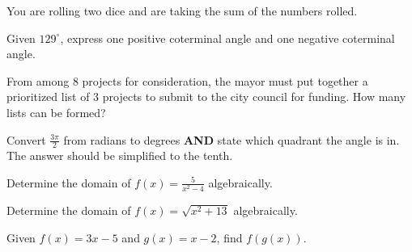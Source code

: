 \documentclass[addpoints]{exam}
\begin{document}
\begin{questions}
    \question[1] You are rolling two dice and are taking the sum of the numbers rolled. 
    \newpage
    \question[1] Given $129^\circ$, express one positive coterminal angle and one negative coterminal angle.
    
    \question[1] From among 8 projects for consideration, the mayor must put together a prioritized list of 3 projects to submit to the city council for funding. How many lists can be formed? 
    
    \question[1] Convert $\frac{3\pi}{2}$ from radians to degrees \textbf{AND} state which quadrant the angle is in. The answer should be simplified to the tenth.  
    
    
    \question[1] Determine the domain of $f(x) = \frac{5}{x^2 - 4}$ algebraically. 
    
    \question[1] Determine the domain of $f(x) = \sqrt{x^2 + 13} $ algebraically. 
    
    \question[1] Given $f(x) = 3x - 5$ and $g(x) = x - 2$, find $f(g(x))$. 
    

\end{questions}
\end{document}
